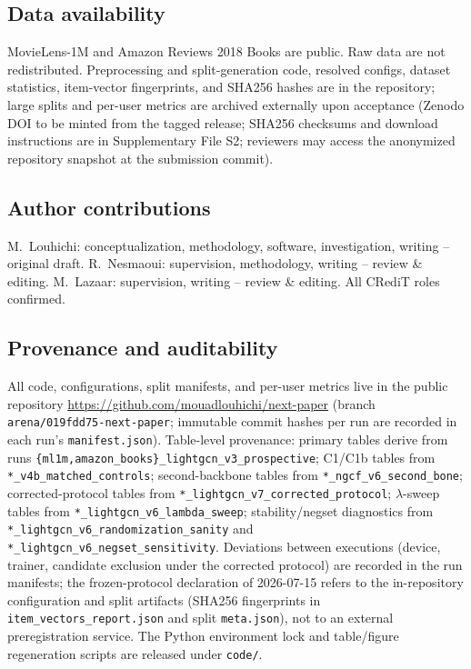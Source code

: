 \documentclass[pdflatex,sn-mathphys-num]{sn-jnl}
\begin{document}
\subsection*{Data availability}
MovieLens-1M and Amazon Reviews 2018 Books are public. Raw data are not redistributed. Preprocessing and split-generation code, resolved configs, dataset statistics, item-vector fingerprints, and SHA256 hashes are in the repository; large splits and per-user metrics are archived externally upon acceptance (Zenodo DOI to be minted from the tagged release; SHA256 checksums and download instructions are in Supplementary File S2; reviewers may access the anonymized repository snapshot at the submission commit).

\subsection*{Author contributions}
M.\ Louhichi: conceptualization, methodology, software, investigation, writing -- original draft. R.\ Nesmaoui: supervision, methodology, writing -- review \& editing. M.\ Lazaar: supervision, writing -- review \& editing. All CRediT roles confirmed.

\subsection*{Provenance and auditability}
All code, configurations, split manifests, and per-user metrics live in the public repository \url{https://github.com/mouadlouhichi/next-paper} (branch \texttt{arena/019fdd75-next-paper}; immutable commit hashes per run are recorded in each run's \texttt{manifest.json}). Table-level provenance: primary tables derive from runs \texttt{\{ml1m,amazon\_books\}\_lightgcn\_v3\_prospective}; C1/C1b tables from \texttt{*\_v4b\_matched\_controls}; second-backbone tables from \texttt{*\_ngcf\_v6\_second\_bone}; corrected-protocol tables from \texttt{*\_lightgcn\_v7\_corrected\_protocol}; $\lambda$-sweep tables from \texttt{*\_lightgcn\_v6\_lambda\_sweep}; stability/negset diagnostics from \texttt{*\_lightgcn\_v6\_randomization\_sanity} and \texttt{*\_lightgcn\_v6\_negset\_sensitivity}. Deviations between executions (device, trainer, candidate exclusion under the corrected protocol) are recorded in the run manifests; the frozen-protocol declaration of 2026-07-15 refers to the in-repository configuration and split artifacts (SHA256 fingerprints in \texttt{item\_vectors\_report.json} and split \texttt{meta.json}), not to an external preregistration service. The Python environment lock and table/figure regeneration scripts are released under \texttt{code/}.


\end{document}
